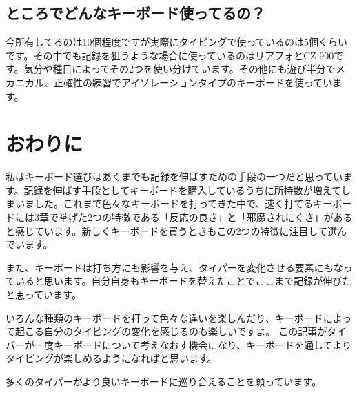 \subsection{ところでどんなキーボード使ってるの？}
今所有してるのは10個程度ですが実際にタイピングで使っているのは5個くらいです。その中でも記録を狙うような場合に使っているのはリアフォとCZ-900です。気分や種目によってその2つを使い分けています。その他にも遊び半分でメカニカル、正確性の練習でアイソレーションタイプのキーボードを使っています。

\section{おわりに}
私はキーボード選びはあくまでも記録を伸ばすための手段の一つだと思っています。記録を伸ばす手段としてキーボードを購入しているうちに所持数が増えてしまいました。これまで色々なキーボードを打ってきた中で、速く打てるキーボードには3章で挙げた2つの特徴である「反応の良さ」と「邪魔されにくさ」があると感じています。新しくキーボードを買うときもこの2つの特徴に注目して選んでいます。

また、キーボードは打ち方にも影響を与え、タイパーを変化させる要素にもなっていると思います。自分自身もキーボードを替えたことでここまで記録が伸びたと思っています。

いろんな種類のキーボードを打って色々な違いを楽しんだり、キーボードによって起こる自分のタイピングの変化を感じるのも楽しいですよ。
この記事がタイパーが一度キーボードについて考えなおす機会になり、キーボードを通してよりタイピングが楽しめるようになればと思います。

多くのタイパーがより良いキーボードに巡り合えることを願っています。
